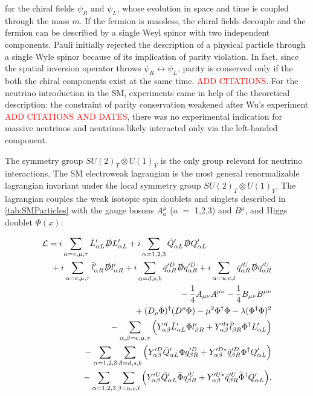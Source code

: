 for the chiral fields $\psi_R$ and $\psi_L$, whose evolution in space and time is coupled through the mass $m$.
If the fermion is massless, the chiral fields decouple and the fermion can be described by a single Weyl spinor with two independent components. Pauli initially rejected the description of a physical particle through a single Wyle spinor because of its implication of parity violation. In fact, since the spatial inversion operator throws $\psi_R \leftrightarrow \psi_L$, parity is conserved only if the both the chiral components exist at the same time. 
\textcolor{red}{ADD CITATIONS}.  For the neutrino introduction in the SM, experiments came in help of the theoretical description:  the constraint of parity conservation weakened after Wu's experiment \textcolor{red}{ADD CITATIONS AND DATES}, there was no experimental indication for massive neutrinos and neutrinos likely interacted only via the left-handed component. 

The symmetry group $SU(2)_T \otimes U(1)_Y$ is the only group relevant for neutrino interactions. The SM electroweak lagrangian is the most general renormalizable lagrangian invariant under the local symmetry group $SU(2)_T \otimes U(1)_Y$. The lagrangian couples the weak isotopic spin doublets and singlets described in \ref{tab:SMParticles} with the gauge bosons  $A^{\mu}_{a}$ ($a$ $=$ 1,2,3) and $B^{\mu}$, and Higgs doublet $\Phi(x)$:

\begin{eqnarray}
\lefteqn{\mathcal{L} = i\sum_{\alpha=e,\mu,\tau} \bar{L}'_{\alpha L}  \slashed D L'_{\alpha L} + 
 i\sum_{\alpha=1,2,3} \bar{Q}'_{\alpha L}  \slashed D Q'_{\alpha L} {}}
 \nonumber\\
 & & {} + i\sum_{\alpha=e,\mu,\tau} \bar{l}'_{\alpha R}  \slashed D l'_{\alpha R} + i\sum_{\alpha=d,s,b} \bar{q}'^D_{\alpha R}  \slashed D q'^D_{\alpha R} + i\sum_{\alpha=u,c,t} \bar{q}'^U_{\alpha R}  \slashed D q'^U_{\alpha R}
 \nonumber\\
 & & {} -\frac{1}{4}A_{\mu \nu}A^{\mu \nu} - \frac{1}{4}B_{\mu \nu}B^{\mu \nu}
 \nonumber\\
 & & {} +(D_{\rho}\Phi)^\dagger(D^{\rho}\Phi) - \mu^2\Phi^\dagger\Phi - \lambda(\Phi^\dagger\Phi)^2 
 \nonumber\\
 & & {} -\sum_{\alpha,\beta=e,\mu,\tau} \Big(Y'^l_{\alpha\beta}\bar{L}'_{\alpha L}  \Phi l'_{\beta R} + Y'^{l*}_{\alpha\beta}\bar{l}'_{\beta R}  \Phi^\dagger L'_{\alpha L}\Big)
  \nonumber\\
 & & {} -\sum_{\alpha=1,2,3} \sum_{\beta=d,s,b} \Big(Y'^D_{\alpha\beta}\bar{Q}'_{\alpha L}  \Phi q'^D_{\beta R} + Y'^{D*}_{\alpha\beta}\bar{q}'^D_{\beta R}  \Phi^\dagger Q'_{\alpha L}\Big)
  \nonumber\\
 & & {} -\sum_{\alpha=1,2,3} \sum_{\beta=u,c,t} \Big(Y'^U_{\alpha\beta}\bar{Q}'_{\alpha L}   \widetilde{\Phi} q'^U_{\beta R} + Y'^{U*}_{\alpha\beta}\bar{q}'^U_{\beta R} \widetilde{\Phi}^\dagger Q'_{\alpha L}\Big).
\end{eqnarray}

